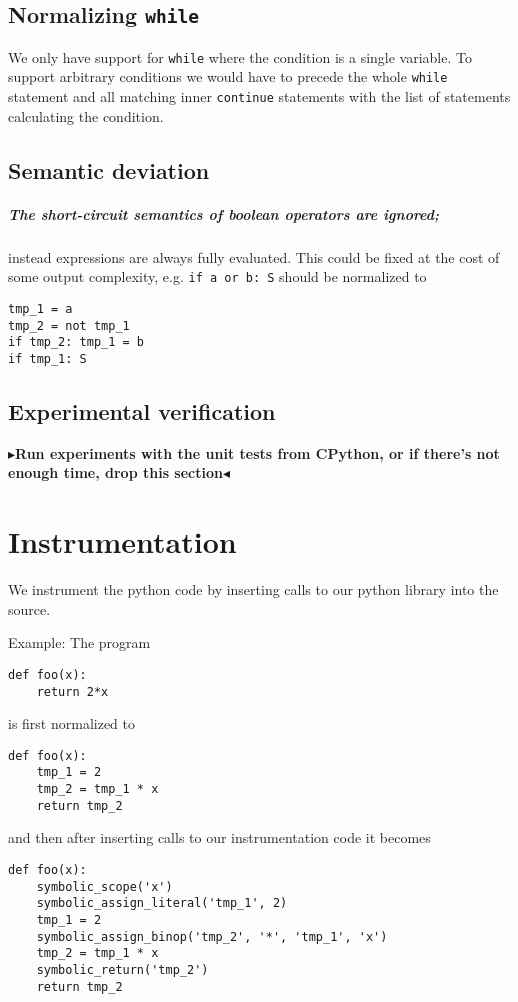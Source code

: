 \documentclass[11pt]{report}
\newcommand{\todo}[1]{{\color[rgb]{.5,0,0}\textbf{$\blacktriangleright$#1$\blacktriangleleft$}}}
\begin{document}
\section{Normalizing {\tt while}}
We only have support for {\tt while} where the condition is a single
variable. To support arbitrary conditions we would have to precede the
whole {\tt while} statement and all matching inner {\tt continue}
statements with the list of statements calculating the condition.

\section{Semantic deviation}
\paragraph{The short-circuit semantics of boolean operators are ignored;}
  instead expressions are always fully evaluated. This could be fixed
  at the cost of some output complexity, e.g. \verb|if a or b: S| should
  be normalized to
\begin{verbatim}
tmp_1 = a
tmp_2 = not tmp_1
if tmp_2: tmp_1 = b
if tmp_1: S
\end{verbatim}

\section{Experimental verification}
\todo{Run experiments with the unit tests from CPython, or if there's
  not enough time, drop this section}


\chapter{Instrumentation}
\label{ch:instumentation}

We instrument the python code by inserting calls to our python
library into the source.

Example: The program
\begin{verbatim}
def foo(x):
    return 2*x
\end{verbatim}
is first normalized to
\begin{verbatim}
def foo(x):
    tmp_1 = 2
    tmp_2 = tmp_1 * x
    return tmp_2
\end{verbatim}
and then after inserting calls to our instrumentation code it becomes
\begin{verbatim}
def foo(x):
    symbolic_scope('x')
    symbolic_assign_literal('tmp_1', 2)
    tmp_1 = 2
    symbolic_assign_binop('tmp_2', '*', 'tmp_1', 'x')
    tmp_2 = tmp_1 * x
    symbolic_return('tmp_2')
    return tmp_2
\end{verbatim}
\end{document}
